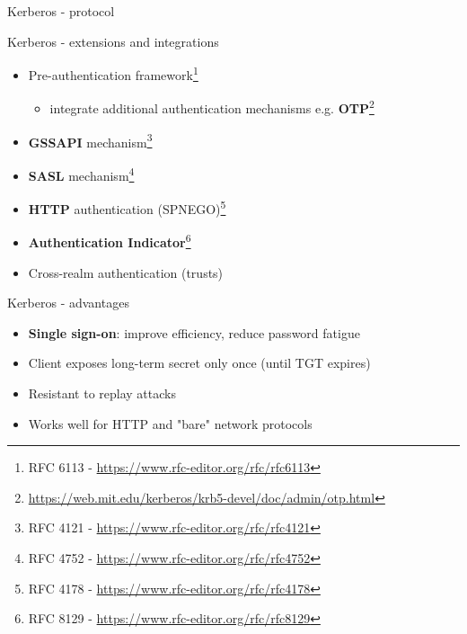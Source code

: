 \documentclass[ignorenonframetext,aspectratio=169,12pt]{beamer}
\def\svgwidth{4cm}
\begin{document}
\begin{frame}{Kerberos - protocol}
\begin{center}
\def\svgwidth{\textwidth}

\end{center}
\end{frame}

\begin{frame}{Kerberos - extensions and integrations}
\protect\hypertarget{kerberos-integrations}{}

\begin{itemize}
    \item Pre-authentication framework\footnote{RFC 6113 - \url{https://www.rfc-editor.org/rfc/rfc6113}}
        \begin{itemize}
            \item integrate additional authentication mechanisms
                e.g. {\bf OTP}\footnote{\url{https://web.mit.edu/kerberos/krb5-devel/doc/admin/otp.html}}
        \end{itemize}
    \item {\bf GSSAPI} mechanism\footnote{RFC 4121 - \url{https://www.rfc-editor.org/rfc/rfc4121}}
    \item {\bf SASL} mechanism\footnote{RFC 4752 - \url{https://www.rfc-editor.org/rfc/rfc4752}}
    \item {\bf HTTP} authentication (SPNEGO)\footnote{RFC 4178 - \url{https://www.rfc-editor.org/rfc/rfc4178}}
    \item {\bf Authentication Indicator}\footnote{RFC 8129 - \url{https://www.rfc-editor.org/rfc/rfc8129}}
    \item Cross-realm authentication (trusts)
\end{itemize}

\end{frame}

\begin{frame}{Kerberos - advantages}
\protect\hypertarget{kerberos-advantages}{}

\begin{itemize}
    \item {\bf Single sign-on}: improve efficiency, reduce password fatigue
    \item Client exposes long-term secret only once (until TGT expires)
    \item Resistant to replay attacks
    \item Works well for HTTP and "bare" network protocols
\end{itemize}

\end{frame}
\end{document}
